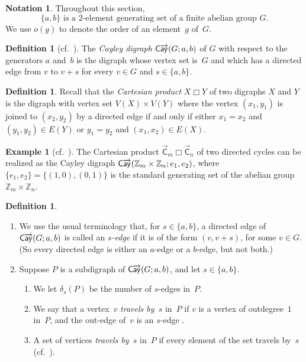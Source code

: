\documentclass[11pt]{amsart}
\makeatletter
\theoremstyle{definition}
\newtheorem{definition}[equation]{Definition}
\newtheorem{example}[equation]{Example}
\newtheorem{notation}[equation]{Notation}
\numberwithin{case}{startcases}
\newcommand{\noprelistbreak}{\@nobreaktrue\nopagebreak\vskip4pt} %
\numberwithin{equation}{section}
\newcommand{\Z}{\mathbb{Z}}  %
\newcommand{\cartprod}{\mathbin{\Box}}
\newcommand{\cayd}{\mathop{\mathsf{C}\mkern-1mu\overrightarrow{\mathsf{ay}}}}
\makeatother
\begin{document}
	\begin{notation}
		Throughout this section, 
		\[ \text{$\{a,b\}$ is a $2$-element generating set of a finite abelian group~$G$.} \]
		We use $o(g)$ to denote the order of an element~$g$ of~$G$.
	\end{notation}
	
	\begin{definition}[cf.\ {\cite[p.~504]{GallianBook}}] \label{CayDigDefn}
		The \emph{Cayley digraph} $\cayd(G; a,b)$ of $G$ with respect to the generators $a$ and~$b$ is the digraph whose vertex set is~$G$ and which has a directed edge from $v$ to $v + s$ for every $v \in G$ and $s \in \{a,b\}$.
	\end{definition}
	
	\begin{definition} \label{CartProdDefn}
		Recall that the \emph{Cartesian product} $X \cartprod Y$ of two digraphs $X$ and $Y$ is the digraph with vertex set $V(X) \times V(Y)$ where the vertex $(x_1, y_1)$ is joined to $(x_2, y_2)$ by a directed edge if and only if either $x_1 = x_2$ and $(y_1, y_2) \in E(Y)$ or $y_1 = y_2$ and $(x_1, x_2) \in E(X)$.
	\end{definition}
	
	\begin{example}[cf.\ {\cite[proof of Lem.~1]{Klerlein}}] \label{CxCIsCay}
		The Cartesian product $\vec{\mathsf C}_m \cartprod \vec{\mathsf C}_n$ of two directed cycles can be realized as the Cayley digraph $\cayd(\Z_m \times \Z_n; e_1, e_2)$, where $\{e_1,e_2\} = \{(1,0), (0,1)\}$ is the standard generating set of the abelian group $\Z_m \times \Z_n$.
	\end{example}
	
	\begin{definition}
		\leavevmode
		\noprelistbreak
		\begin{enumerate}
			\item We use the usual terminology that, for $s \in \{a,b\}$, a directed edge of $\cayd(G; a,b)$ is called an \emph{$s$-edge} if it is of the form $(v, v + s)$, for some $v \in G$.
			(So every directed edge is either an $a$-edge or a $b$-edge, but not both.)
			\item
			Suppose $P$ is a subdigraph of $\cayd(G; a,b)$, and let $s \in \{a,b\}$.
			\begin{enumerate}
				\item We let $\delta_s(P)$ be the number of $s$-edges in~$P$.
				\item We say that a vertex~$v$ \emph{travels by~$s$} in~$P$ if $v$ is a vertex of outdegree~$1$ in~$P$, and the out-edge of~$v$ is an $s$-edge \cite[p.~82]{Housman}.
				\item A set of vertices \emph{travels by~$s$} in~$P$ if every element of the set travels by~$s$ (cf.\ \cite[p.~83]{Housman}).
				
			\end{enumerate}
		\end{enumerate}
	\end{definition}
	
\end{document}
